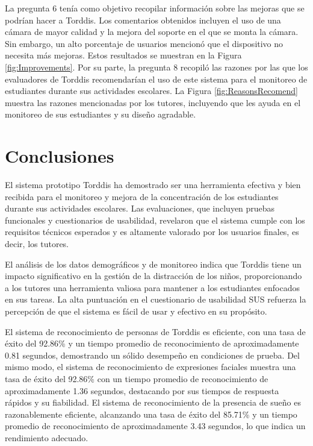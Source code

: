 \documentclass[a4paper,fleqn]{cas-sc}
\begin{document}
	La pregunta 6 tenía como objetivo recopilar información sobre las mejoras que se podrían hacer a Torddis. Los comentarios obtenidos incluyen el uso de una cámara de mayor calidad y la mejora del soporte en el que se monta la cámara. Sin embargo, un alto porcentaje de usuarios mencionó que el dispositivo no necesita más mejoras. Estos resultados se muestran en la Figura \ref{fig:Improvements}. Por su parte, la pregunta 8 recopiló las razones por las que los evaluadores de Torddis recomendarían el uso de este sistema para el monitoreo de estudiantes durante sus actividades escolares. La Figura \ref{fig:ReasonsRecomend} muestra las razones mencionadas por los tutores, incluyendo que les ayuda en el monitoreo de sus estudiantes y su diseño agradable.
	
	\section{Conclusiones}
	\label{seccion:Seis}
	El sistema prototipo Torddis ha demostrado ser una herramienta efectiva y bien recibida para el monitoreo y mejora de la concentración de los estudiantes durante sus actividades escolares. Las evaluaciones, que incluyen pruebas funcionales y cuestionarios de usabilidad, revelaron que el sistema cumple con los requisitos técnicos esperados y es altamente valorado por los usuarios finales, es decir, los tutores.
	
	El análisis de los datos demográficos y de monitoreo indica que Torddis tiene un impacto significativo en la gestión de la distracción de los niños, proporcionando a los tutores una herramienta valiosa para mantener a los estudiantes enfocados en sus tareas. La alta puntuación en el cuestionario de usabilidad SUS refuerza la percepción de que el sistema es fácil de usar y efectivo en su propósito.
	
	El sistema de reconocimiento de personas de Torddis es eficiente, con una tasa de éxito del 92.86\% y un tiempo promedio de reconocimiento de aproximadamente 0.81 segundos, demostrando un sólido desempeño en condiciones de prueba. Del mismo modo, el sistema de reconocimiento de expresiones faciales muestra una tasa de éxito del 92.86\% con un tiempo promedio de reconocimiento de aproximadamente 1.36 segundos, destacando por sus tiempos de respuesta rápidos y su fiabilidad. El sistema de reconocimiento de la presencia de sueño es razonablemente eficiente, alcanzando una tasa de éxito del 85.71\% y un tiempo promedio de reconocimiento de aproximadamente 3.43 segundos, lo que indica un rendimiento adecuado.
	
\end{document}
